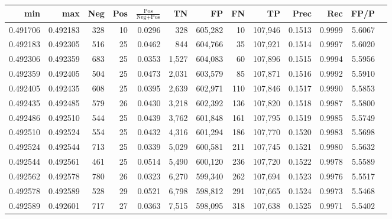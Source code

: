 \begin{tabular}{rrrrrrrrrrrrr}
\toprule
     min &      max & Neg & Pos & $\frac{\text{Pos}}{\text{Neg}+\text{Pos}}$ &      TN &      FP &      FN &      TP &   Prec &    Rec &   FP/P \\
\midrule
0.491706 & 0.492183 & 328 &  10 &                                     0.0296 &     328 & 605,282 &      10 & 107,946 & 0.1513 & 0.9999 & 5.6067 \\
0.492183 & 0.492305 & 516 &  25 &                                     0.0462 &     844 & 604,766 &      35 & 107,921 & 0.1514 & 0.9997 & 5.6020 \\
0.492306 & 0.492359 & 683 &  25 &                                     0.0353 &   1,527 & 604,083 &      60 & 107,896 & 0.1515 & 0.9994 & 5.5956 \\
0.492359 & 0.492405 & 504 &  25 &                                     0.0473 &   2,031 & 603,579 &      85 & 107,871 & 0.1516 & 0.9992 & 5.5910 \\
0.492405 & 0.492435 & 608 &  25 &                                     0.0395 &   2,639 & 602,971 &     110 & 107,846 & 0.1517 & 0.9990 & 5.5853 \\
0.492435 & 0.492485 & 579 &  26 &                                     0.0430 &   3,218 & 602,392 &     136 & 107,820 & 0.1518 & 0.9987 & 5.5800 \\
0.492486 & 0.492510 & 544 &  25 &                                     0.0439 &   3,762 & 601,848 &     161 & 107,795 & 0.1519 & 0.9985 & 5.5749 \\
0.492510 & 0.492524 & 554 &  25 &                                     0.0432 &   4,316 & 601,294 &     186 & 107,770 & 0.1520 & 0.9983 & 5.5698 \\
0.492524 & 0.492544 & 713 &  25 &                                     0.0339 &   5,029 & 600,581 &     211 & 107,745 & 0.1521 & 0.9980 & 5.5632 \\
0.492544 & 0.492561 & 461 &  25 &                                     0.0514 &   5,490 & 600,120 &     236 & 107,720 & 0.1522 & 0.9978 & 5.5589 \\
0.492562 & 0.492578 & 780 &  26 &                                     0.0323 &   6,270 & 599,340 &     262 & 107,694 & 0.1523 & 0.9976 & 5.5517 \\
0.492578 & 0.492589 & 528 &  29 &                                     0.0521 &   6,798 & 598,812 &     291 & 107,665 & 0.1524 & 0.9973 & 5.5468 \\
0.492589 & 0.492601 & 717 &  27 &                                     0.0363 &   7,515 & 598,095 &     318 & 107,638 & 0.1525 & 0.9971 & 5.5402 \\

\end{tabular}

